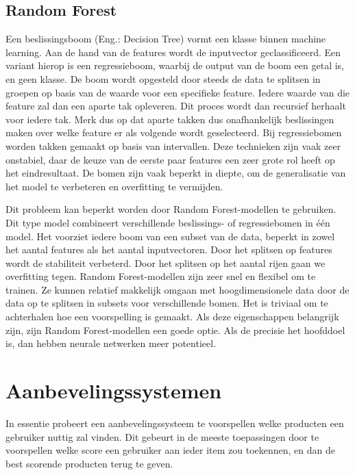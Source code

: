 

\subsection{Random Forest}
Een beslissingsboom (Eng.: Decision Tree) vormt een klasse binnen machine learning. Aan de hand van de features wordt de inputvector geclassificeerd. Een variant hierop is een regressieboom, waarbij de output van de boom een getal is, en geen klasse. De boom wordt opgesteld door steeds de data te splitsen in groepen op basis van de waarde voor een specifieke feature. Iedere waarde van die feature zal dan een aparte tak opleveren. Dit proces wordt dan recursief herhaalt voor iedere tak. Merk dus op dat aparte takken dus onafhankelijk beslissingen maken over welke feature er als volgende wordt geselecteerd. Bij regressiebomen worden takken gemaakt op basis van intervallen. Deze technieken zijn vaak zeer onstabiel, daar de keuze van de eerste paar features een zeer grote rol heeft op het eindresultaat. De bomen zijn vaak beperkt in diepte, om de generalisatie van het model te verbeteren en overfitting te vermijden.


Dit probleem kan beperkt worden door Random Forest-modellen te gebruiken. Dit type model combineert verschillende beslissings- of regressiebomen in één model. Het voorziet iedere boom van een subset van de data, beperkt in zowel het aantal features als het aantal inputvectoren. Door het splitsen op features wordt de stabiliteit verbeterd. Door het splitsen op het aantal rijen gaan we overfitting tegen. Random Forest-modellen zijn zeer snel en flexibel om te trainen. Ze kunnen relatief makkelijk omgaan met hoogdimensionele data door de data op te splitsen in subsets voor verschillende bomen. Het is triviaal om te achterhalen hoe een voorspelling is gemaakt. Als deze eigenschappen belangrijk zijn, zijn Random Forest-modellen een goede optie. Als de precisie het hoofddoel is, dan hebben neurale netwerken meer potentieel. \cite{cursus_ML_supervised}






\section{Aanbevelingssystemen}
\label{sec:chapt2_huidige_technieken_aanbevelingssystemen}
In essentie probeert een aanbevelingssysteem te voorspellen welke producten een gebruiker nuttig zal vinden. Dit gebeurt in de meeste toepassingen \cite{overzicht_technieken} door te voorspellen welke score een gebruiker aan ieder item zou toekennen, en dan de best scorende producten terug te geven. 

